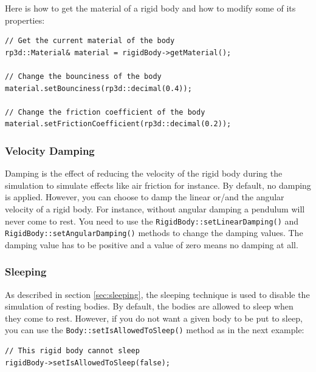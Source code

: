 \documentclass[a4paper,12pt]{article}
\begin{document}
    Here is how to get the material of a rigid body and how to modify some of its properties: \\

    \begin{lstlisting}
// Get the current material of the body
rp3d::Material& material = rigidBody->getMaterial();

// Change the bounciness of the body
material.setBounciness(rp3d::decimal(0.4));

// Change the friction coefficient of the body
material.setFrictionCoefficient(rp3d::decimal(0.2));
  \end{lstlisting}

    \subsubsection{Velocity Damping}

    \begin{sloppypar}
      Damping is the effect of reducing the velocity of the rigid body during the simulation to simulate effects like air friction for instance. By default, no damping
      is applied. However, you can choose to damp the linear or/and the angular velocity of a rigid body. For instance, without angular damping a pendulum will never come
      to rest. You need to use the \texttt{RigidBody::setLinearDamping()} and \texttt{RigidBody::setAngularDamping()} methods to change the damping values. The damping
      value has to be positive and a value of zero means no damping at all.
    \end{sloppypar}

    \subsubsection{Sleeping}
    \label{sec:rigidbodysleeping}

    As described in section \ref{sec:sleeping}, the sleeping technique is used to disable the simulation of resting bodies. By default, the bodies are allowed to sleep
    when they come to rest. However, if you do not want a given body to be put to sleep, you can use the \texttt{Body::setIsAllowedToSleep()} method as in the next example: \\

   \begin{lstlisting}
// This rigid body cannot sleep
rigidBody->setIsAllowedToSleep(false);
 \end{lstlisting}
\end{document}
